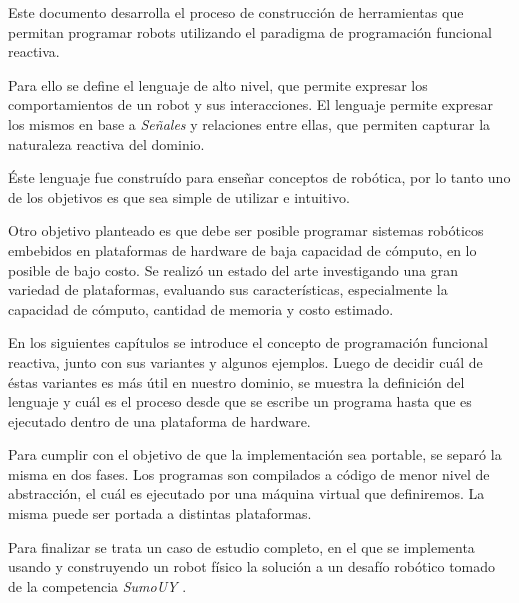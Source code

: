 

  Este documento desarrolla el proceso de construcción de
herramientas que permitan programar robots utilizando
el paradigma de programación funcional reactiva.

  Para ello se define el lenguaje \frob{} de alto nivel,
que permite expresar los comportamientos de un robot y sus
interacciones.
  El lenguaje permite expresar los mismos en base a
\emph{Señales} y relaciones entre ellas, que permiten
capturar la naturaleza reactiva del dominio.

  Éste lenguaje fue construído para
enseñar conceptos de robótica, por lo tanto
uno de los objetivos es que sea simple de
utilizar e intuitivo.

  Otro objetivo planteado es que debe ser posible programar
sistemas robóticos embebidos en plataformas de
hardware de baja capacidad de cómputo, en lo posible de
bajo costo.
  Se realizó un estado del arte investigando una gran variedad
de plataformas, evaluando sus características,
especialmente la capacidad de cómputo, cantidad de memoria y
costo estimado.

  En los siguientes capítulos se introduce el concepto de
programación funcional reactiva, junto con sus variantes y
algunos ejemplos.
  Luego de decidir cuál de éstas variantes es más útil
en nuestro dominio, se muestra la definición del lenguaje
\frob{} y cuál es el proceso desde que se escribe un programa
hasta que es ejecutado dentro de una plataforma de hardware.

  Para cumplir con el objetivo de que la implementación sea
portable, se separó la misma en dos fases. Los programas son
compilados a código \alf{} de menor nivel de abstracción,
el cuál es ejecutado por una máquina virtual que definiremos.
  La misma puede ser portada a distintas plataformas.

  Para finalizar se trata un caso de estudio completo, en el
que se implementa usando \frob{} y construyendo un robot físico
la solución a un desafío robótico tomado de la
competencia \textit{SumoUY} \cite{sumouy}.
